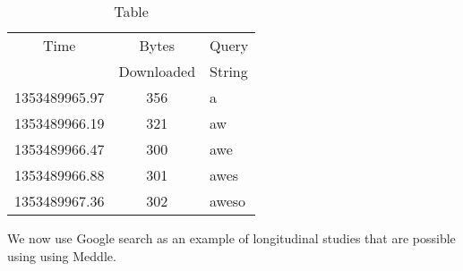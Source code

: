

\begin{table}
\begin{center}
\begin{tabular}{|c|c|l|}
\hline
Time & Bytes & Query \tabularnewline
 & Downloaded & String\tabularnewline
\hline 
1353489965.97 & 356 & a \tabularnewline
\hline
1353489966.19& 321 & aw\tabularnewline
\hline
1353489966.47& 300 & awe\tabularnewline
\hline
1353489966.88& 301 & awes\tabularnewline
\hline
1353489967.36& 302 & aweso\tabularnewline
\hline
\end{tabular}
\end{center}
\caption{Table}
\label{tab:ExampleGoogleSearch}
\end{table}
We now use Google search as an example of longitudinal studies that
are possible using using Meddle.

